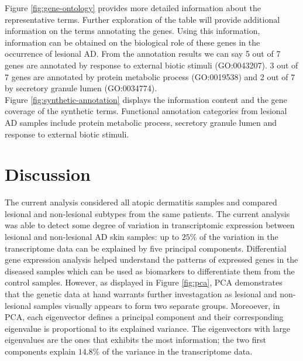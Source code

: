\documentclass[journal, a4paper]{IEEEtran}
\begin{document}
Figure \ref{fig:gene-ontology} provides more detailed information about the representative terms. Further exploration of the table will provide additional information on the terms annotating the genes. Using this information, information can be obtained on the biological role of these genes in the occurrence of lesional AD. From the annotation results we can say 5 out of 7 genes are annotated by  response to external biotic stimuli (GO:0043207). 3 out of 7 genes are annotated by protein metabolic process (GO:0019538) and 2 out of 7 by secretory granule lumen (GO:0034774).\\

Figure \ref{fig:synthetic-annotation} displays the information content and the gene coverage of the synthetic terms. Functional annotation categories from lesional AD samples include protein metabolic process, secretory granule lumen and response to external biotic stimuli.\\



\section{\textbf{Discussion}}

The current analysis considered all atopic dermatitis samples and compared lesional and non-lesional subtypes from the same patients. The current analysis was able to detect some degree of variation in transcriptomic expression between lesional and non-lesional AD skin samples: up to $25\%$ of the variation in the transcriptome data can be explained by five principal components. Differential gene expression analysis helped understand the patterns of expressed genes in the diseased samples which can be used as biomarkers to differentiate them from the control samples. However, as displayed in Figure \ref{fig:pca}, PCA demonstrates that the genetic data at hand warrants further investagation as lesional and non-lesional samples visually appears to form two separate groups. Moreoever, in PCA, each eigenvector defines a principal component and their corresponding eigenvalue is proportional to its explained variance. The eigenvectors with large eigenvalues are the ones that exhibits the most information; the two first components explain $14.8\%$ of the variance in the transcriptome data.\\%
\end{document}
